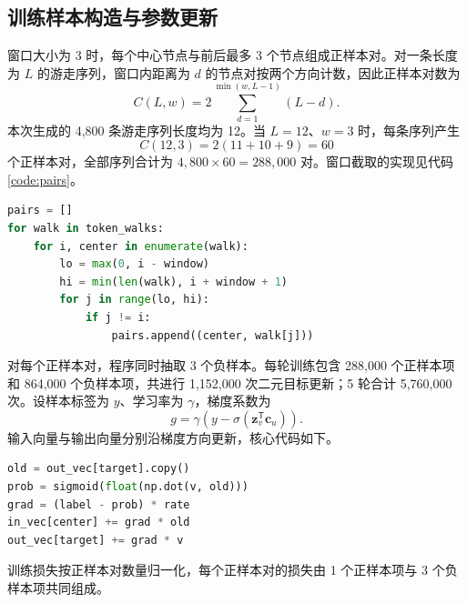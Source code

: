 \documentclass[UTF8,a4paper,12pt,fontset=windows]{ctexart}
\begin{document}
\subsection{训练样本构造与参数更新}
窗口大小为 3 时，每个中心节点与前后最多 3 个节点组成正样本对。对一条长度为 $L$ 的游走序列，窗口内距离为 $d$ 的节点对按两个方向计数，因此正样本对数为
\begin{equation}
C(L,w)=2\sum_{d=1}^{\min(w,L-1)}(L-d).
\end{equation}
本次生成的 4,800 条游走序列长度均为 12。当 $L=12$、$w=3$ 时，每条序列产生
\begin{equation}
C(12,3)=2(11+10+9)=60
\end{equation}
个正样本对，全部序列合计为 $4{,}800\times60=288{,}000$ 对。窗口截取的实现见代码\ref{code:pairs}。
\par\noindent\begin{minipage}{\linewidth}
\begin{lstlisting}[language=Python,caption={Skip-gram 正样本对构造},label={code:pairs}]
pairs = []
for walk in token_walks:
    for i, center in enumerate(walk):
        lo = max(0, i - window)
        hi = min(len(walk), i + window + 1)
        for j in range(lo, hi):
            if j != i:
                pairs.append((center, walk[j]))
\end{lstlisting}
\end{minipage}\par

对每个正样本对，程序同时抽取 3 个负样本。每轮训练包含 288,000 个正样本项和 864,000 个负样本项，共进行 1,152,000 次二元目标更新；5 轮合计 5,760,000 次。设样本标签为 $y$、学习率为 $\gamma$，梯度系数为
\begin{equation}
g=\gamma\left(y-\sigma(\mathbf{z}_v^{\mathsf T}\mathbf{c}_u)\right).
\end{equation}
输入向量与输出向量分别沿梯度方向更新，核心代码如下。
\par\noindent\begin{minipage}{\linewidth}
\begin{lstlisting}[language=Python,caption={负采样梯度更新},label={code:sgns}]
old = out_vec[target].copy()
prob = sigmoid(float(np.dot(v, old)))
grad = (label - prob) * rate
in_vec[center] += grad * old
out_vec[target] += grad * v
\end{lstlisting}
\end{minipage}\par
训练损失按正样本对数量归一化，每个正样本对的损失由 1 个正样本项与 3 个负样本项共同组成。
\end{document}
